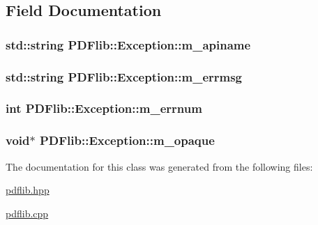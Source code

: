 \subsection{Field Documentation}
\hypertarget{classPDFlib_1_1Exception_a23e1637eebbe959aa47c80c81f0fd386}{
\subsubsection[{m\+\_\+apiname}]{\setlength{\rightskip}{0pt plus 5cm}std\+::string P\+D\+Flib\+::\+Exception\+::m\+\_\+apiname\hspace{0.3cm}{\ttfamily [private]}}}\label{classPDFlib_1_1Exception_a23e1637eebbe959aa47c80c81f0fd386}
\hypertarget{classPDFlib_1_1Exception_a03c21a477c8645b05e3f4b8367f14d47}{
\subsubsection[{m\+\_\+errmsg}]{\setlength{\rightskip}{0pt plus 5cm}std\+::string P\+D\+Flib\+::\+Exception\+::m\+\_\+errmsg\hspace{0.3cm}{\ttfamily [private]}}}\label{classPDFlib_1_1Exception_a03c21a477c8645b05e3f4b8367f14d47}
\hypertarget{classPDFlib_1_1Exception_a768df1c2eeb409c9d5a5814bc2d367dc}{
\subsubsection[{m\+\_\+errnum}]{\setlength{\rightskip}{0pt plus 5cm}int P\+D\+Flib\+::\+Exception\+::m\+\_\+errnum\hspace{0.3cm}{\ttfamily [private]}}}\label{classPDFlib_1_1Exception_a768df1c2eeb409c9d5a5814bc2d367dc}
\hypertarget{classPDFlib_1_1Exception_ab18c530da60097292993918457fa0171}{
\subsubsection[{m\+\_\+opaque}]{\setlength{\rightskip}{0pt plus 5cm}void$\ast$ P\+D\+Flib\+::\+Exception\+::m\+\_\+opaque\hspace{0.3cm}{\ttfamily [private]}}}\label{classPDFlib_1_1Exception_ab18c530da60097292993918457fa0171}


The documentation for this class was generated from the following files\+:\begin{DoxyCompactItemize}
\item 
\hyperlink{pdflib_8hpp}{pdflib.\+hpp}\item 
\hyperlink{pdflib_8cpp}{pdflib.\+cpp}\end{DoxyCompactItemize}
